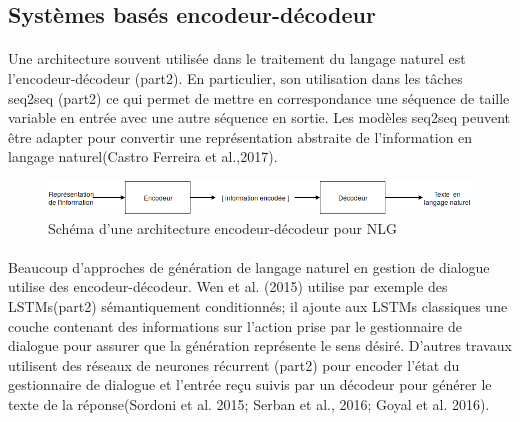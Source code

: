 \subsection{Systèmes basés encodeur-décodeur}
\paragraph{}
Une architecture souvent utilisée dans le traitement du langage naturel est l’encodeur-décodeur (part2). En particulier, son utilisation dans les tâches seq2seq (part2) ce qui permet de mettre en correspondance une séquence de taille variable en entrée avec une autre séquence en sortie. Les modèles seq2seq peuvent être adapter pour convertir une représentation abstraite de l’information en langage naturel(Castro Ferreira et al.,2017).\newline
\begin{figure}[H]
	\centering
	\includegraphics[width=.95\linewidth]{images/NLG/Encoder.png} 
	\caption{Schéma d'une architecture encodeur-décodeur pour NLG} 
\end{figure}
\paragraph{}
Beaucoup d’approches de génération de langage naturel en gestion de dialogue utilise des encodeur-décodeur. Wen et al. (2015) utilise par exemple des LSTMs(part2) sémantiquement conditionnés; il ajoute aux LSTMs classiques une couche contenant des informations sur l’action prise par le gestionnaire de dialogue pour assurer que la génération représente le sens désiré. D’autres travaux utilisent des réseaux de neurones récurrent (part2) pour encoder l’état du gestionnaire de dialogue et l’entrée reçu suivis par un décodeur pour générer le texte de la réponse(Sordoni et al. 2015; Serban et al., 2016; Goyal et al. 2016).
	